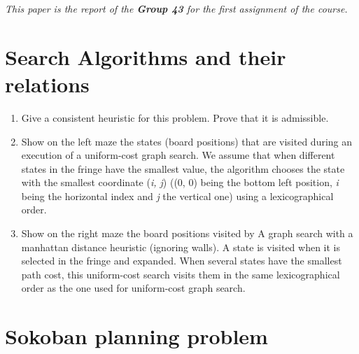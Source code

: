 \bigskip
\textit{This paper is the report of the \textbf{Group 43} for the first assignment
of the course.}

\section{Search Algorithms and their relations}

\begin{enumerate}
 \item Give a consistent heuristic for this problem. Prove that it is admissible.
    \begin{framed}
    \end{framed}
 \item Show on the left maze the states (board positions) that are visited during an
execution of a uniform-cost graph search. We assume that when different states
in the fringe have the smallest value, the algorithm chooses the state with
the smallest coordinate (\textit{i, j}) ((0, 0) being the bottom left position, \textit{i} being the
horizontal index and \textit{j} the vertical one) using a lexicographical order.
    \begin{framed}
    \end{framed}
  \item Show on the right maze the board positions visited by A graph search with
a manhattan distance heuristic (ignoring walls). A state is visited when it is
selected in the fringe and expanded. When several states have the smallest
path cost, this uniform-cost search visits them in the same lexicographical order
as the one used for uniform-cost graph search.
    \begin{framed}
    \end{framed}

\end{enumerate}

\section{Sokoban planning problem}

